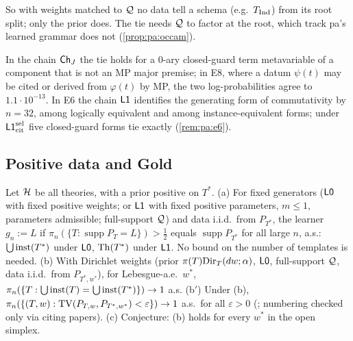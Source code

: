 \noindent So with weights matched to $\mathcal{Q}$ no data tell a schema (e.g.\ $T_{\mathrm{Ind}}$) from its root split; only the prior does. The tie needs $\mathcal{Q}$ to factor at the root, which track pa's learned grammar does not (\cref{prop:pa:occam}).

\begin{remark}\identbrk{}\label{rem:ident:splitsL1}
In the chain $\mathsf{Ch}_{J}$ the tie holds for a $0$-ary closed-guard term metavariable of a component that is not an MP major premise; in E8, where a datum $\psi(t)$ may be cited or derived from $\varphi(t)$ by MP, the two log-probabilities agree to $1.1\cdot10^{-13}$. In E6 the chain $\mathord{\mathsf{L1}}$ identifies the generating form of commutativity by $n=32$, among logically equivalent and among instance-equivalent forms; under $\mathord{\mathsf{L1}}^{\mathrm{sel}}_{\mathrm{cit}}$ five closed-guard forms tie exactly (\cref{rem:pa:e6}).
\end{remark}

\subsection{Positive data and Gold}\label{sec:ident:gold}

\begin{theorem}\identbrk{}\label{thm:ident:limit}
Let $\mathcal{H}$ be all theories, with a prior positive on $T^*$.
(a) For fixed generators ($\mathord{\mathsf{L0}}$ with fixed positive weights; or $\mathord{\mathsf{L1}}$ with fixed positive parameters, $m\le1$, parameters admissible; full-support $\mathcal{Q}$) and data i.i.d.\ from $P_{T^*}$, the learner $g_n:=L$ if $\pi_n(\{T:\operatorname{supp}P_T=L\})>\frac12$ equals $\operatorname{supp}P_{T^*}$ for all large $n$, a.s.: $\bigcup\mathrm{inst}(T^*)$ under $\mathord{\mathsf{L0}}$, $\mathrm{Th}(T^*)$ under $\mathord{\mathsf{L1}}$. No bound on the number of templates is needed.
(b) With Dirichlet weights (prior $\pi(T)\mathrm{Dir}_T(dw;\alpha)$, $\mathord{\mathsf{L0}}$, full-support $\mathcal{Q}$, data i.i.d.\ from $P_{T^*,w^*}$), for Lebesgue-a.e.\ $w^*$, $\pi_n(\{T:\bigcup\mathrm{inst}(T)=\bigcup\mathrm{inst}(T^*)\})\to1$ a.s.
(b$'$) Under (b), $\pi_n(\{(T,w):\mathrm{TV}(P_{T,w},P_{T^*,w^*})<\varepsilon\})\to1$ a.s.\ for all $\varepsilon>0$ (\citealp[Thm~6.9]{ghosal2017fundamentals}; numbering checked only via citing papers).
(c) Conjecture: (b) holds for every $w^*$ in the open simplex.
\end{theorem}

